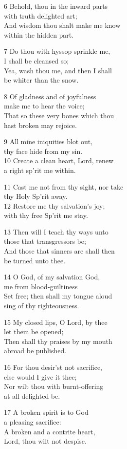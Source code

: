 \begin{multicols}{3}
6 Behold, thou in the inward parts\\
with truth delighted art;\\
And wisdom thou shalt make me know\\
within the hidden part.

7 Do thou with hyssop sprinkle me,\\
I shall be cleansed so;\\
Yea, wash thou me, and then I shall\\
be whiter than the snow.

8 Of gladness and of joyfulness\\
make me to hear the voice;\\
That so these very bones which thou\\
hast broken may rejoice.

9 All mine iniquities blot out,\\
thy face hide from my sin.\\
10 Create a clean heart, Lord, renew\\
a right sp’rit me within.

11 Cast me not from thy sight, nor take\\
thy Holy Sp’rit away.\\
12 Restore me thy salvation’s joy;\\
with thy free Sp’rit me stay.

13 Then will I teach thy ways unto\\
those that transgressors be;\\
And those that sinners are shall then\\
be turned unto thee.

14 O God, of my salvation God,\\
me from blood-guiltiness\\
Set free; then shall my tongue aloud\\
sing of thy righteousness.

15 My closed lips, O Lord, by thee\\
let them be opened;\\
Then shall thy praises by my mouth\\
abroad be published.

16 For thou desir’st not sacrifice,\\
else would I give it thee;\\
Nor wilt thou with burnt-offering\\
at all delighted be.

17 A broken spirit is to God\\
a pleasing sacrifice:\\
A broken and a contrite heart,\\
Lord, thou wilt not despise.


\end{multicols}
